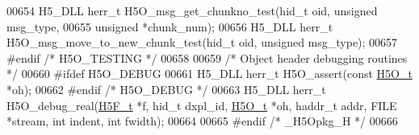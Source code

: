 \begin{DoxyCode}
00654 H5\_DLL herr\_t H5O\_msg\_get\_chunkno\_test(hid\_t oid, \textcolor{keywordtype}{unsigned} msg\_type,
00655     \textcolor{keywordtype}{unsigned} *chunk\_num);
00656 H5\_DLL herr\_t H5O\_msg\_move\_to\_new\_chunk\_test(hid\_t oid, \textcolor{keywordtype}{unsigned} msg\_type);
00657 \textcolor{preprocessor}{#endif }\textcolor{comment}{/* H5O\_TESTING */}\textcolor{preprocessor}{}
00658 
00659 \textcolor{comment}{/* Object header debugging routines */}
00660 \textcolor{preprocessor}{#ifdef H5O\_DEBUG}
00661 H5\_DLL herr\_t H5O\_assert(\textcolor{keyword}{const} \hyperlink{struct_h5_o__t}{H5O\_t} *oh);
00662 \textcolor{preprocessor}{#endif }\textcolor{comment}{/* H5O\_DEBUG */}\textcolor{preprocessor}{}
00663 H5\_DLL herr\_t H5O\_debug\_real(\hyperlink{struct_h5_f__t}{H5F\_t} *f, hid\_t dxpl\_id, \hyperlink{struct_h5_o__t}{H5O\_t} *oh, haddr\_t addr, FILE *stream, \textcolor{keywordtype}{int} 
      indent, \textcolor{keywordtype}{int} fwidth);
00664 
00665 \textcolor{preprocessor}{#endif }\textcolor{comment}{/* \_H5Opkg\_H */}\textcolor{preprocessor}{}
00666 
\end{DoxyCode}
